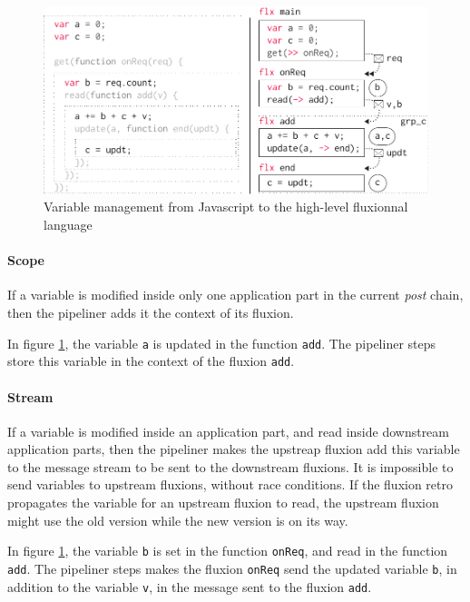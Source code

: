 \begin{figure}[h!]
\begin{center}
  \includegraphics[width=\linewidth]{ressources/states.pdf}
  \caption{Variable management from Javascript to the high-level fluxionnal language}
  \label{fig:states}
\end{center}
\end{figure}

\paragraph{Scope}
If a variable is modified inside only one application part in the current \textit{post} chain, then the pipeliner adds it the context of its fluxion.

In figure \ref{fig:states}, the variable \texttt{a} is updated in the function \texttt{add}.
The pipeliner steps store this variable in the context of the fluxion \texttt{add}.

\paragraph{Stream}
If a variable is modified inside an application part, and read inside downstream application parts, then the pipeliner makes the upstreap fluxion add this variable to the message stream to be sent to the downstream fluxions.
It is impossible to send variables to upstream flux\-ions, without race conditions.
If the fluxion retro propagates the variable for an upstream fluxion to read, the upstream fluxion might use the old version while the new version is on its way.

In figure \ref{fig:states}, the variable \texttt{b} is set in the function \texttt{onReq}, and read in the function \texttt{add}.
The pipeliner steps makes the fluxion \texttt{onReq} send the updated variable \texttt{b}, in addition to the variable \texttt{v}, in the message sent to the fluxion \texttt{add}.

